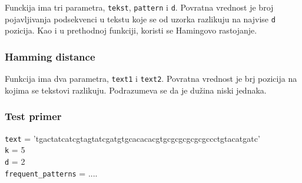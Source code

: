 Funckija ima tri parametra, \texttt{tekst}, \texttt{pattern} i \texttt{d}. Povratna vrednost je broj pojavljivanja podsekvenci u tekstu koje se od uzorka razlikuju na najvise \texttt{d} pozicija. Kao i u prethodnoj funkciji, koristi se Hamingovo rastojanje.




\subsubsection{Hamming distance}
\label{hammingDistance}

Funkcija ima dva parametra, \texttt{text1} i \texttt{text2}. Povratna vrednost je brj pozicija na kojima se tekstovi razlikuju. Podrazumeva se da je dužina niski jednaka. 





\subsubsection{Test primer}
\noindent\texttt{text} = 'tgactatcatcgtagtatcgatgtgcacacacgtgcgcgcgcgcgccctgtacatgatc' \\\texttt{k} = 5
\\\texttt{d} = 2
\\\texttt{frequent\_patterns} = ....









